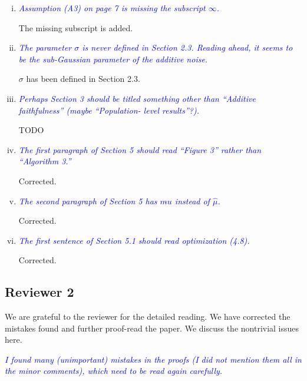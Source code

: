 \documentclass[pdftex,12pt]{article}
\let\hat\widehat
\def\rc#1{{\it\textcolor{blue}{#1}}\smallskip}
\begin{document}
\begin{enumerate}[(1)]
\begin{enumerate}[(i)]
\item \rc{Assumption (A3) on page 7 is missing the subscript $\infty$.}

The missing subscript is added.

\item \rc{The parameter $\sigma$ is never defined in Section 2.3. Reading ahead,
it seems to be the sub-Gaussian parameter of the additive noise.}

$\sigma$ has been defined in Section 2.3.

\item \rc{Perhaps Section 3 should be titled something other than ``Additive
faithfulness'' (maybe ``Population- level results''?).}

TODO

\item \rc{The first paragraph of Section 5 should read
  ``Figure 3'' rather than ``Algorithm 3.''}

Corrected.

\item \rc{The second paragraph of Section 5 has $m\hat{}u$ instead of $\hat\mu$.}

Corrected.

\item \rc{The first sentence of Section 5.1 should read optimization (4.8).}

Corrected.

\end{enumerate}

\end{enumerate}

\subsection*{Reviewer 2}


We are grateful to the reviewer for the detailed reading. We have corrected the mistakes found and further proof-read the paper. We discuss the nontrivial issues here.  

\rc{I found many (unimportant) mistakes in the proofs (I
  did not mention them all in the minor comments), which need to be
  read again carefully.}
\end{document}
